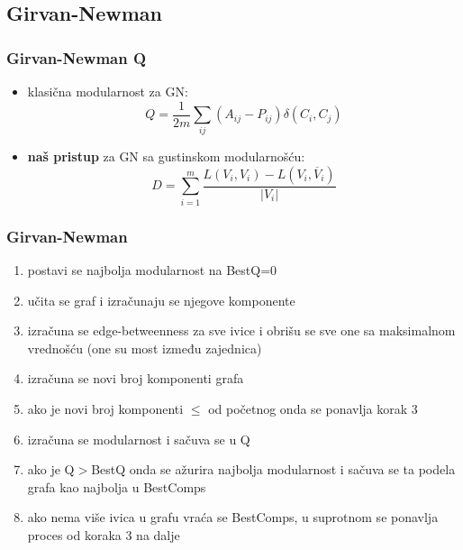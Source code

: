 \documentclass{beamer}
\begin{document}
\subsection{Girvan-Newman}

\begin{frame}\frametitle{Girvan-Newman Q}
\begin{itemize}

\item klasična modularnost za GN: \begin{equation} Q = \frac{1}{2m} \sum_{ij}{}(A_{ij} - P_{ij}) \delta(C_{i}, C_{j})
\end{equation}
\item \textbf{naš pristup} za GN sa gustinskom modularnošću: \begin{equation} D = \sum_{i = 1}^{m} \frac{L(V_{i},  V_{i}) - L(V_{i}, \overline V_{i})}{|V_{i}|} 
\end{equation}
\end{itemize}
\end{frame}

\begin{frame}\frametitle{Girvan-Newman}

\begin{enumerate}
\item postavi se najbolja modularnost na BestQ=0
\item učita se graf i izračunaju se njegove komponente
\item izračuna se edge-betweenness za sve ivice i obrišu se sve one sa maksimalnom vrednošću (one su most između zajednica)
\item izračuna se novi broj komponenti grafa
\item ako je novi broj komponenti $\leq$ od početnog onda se ponavlja korak 3
\item izračuna se modularnost i sačuva se u Q
\item ako je Q$>$BestQ onda se ažurira najbolja modularnost i sačuva se ta podela grafa kao najbolja u BestComps 
\item ako nema više ivica u grafu vraća se BestComps, u suprotnom se ponavlja proces od koraka 3 na dalje
\end{enumerate}

\end{frame}
\end{document}
